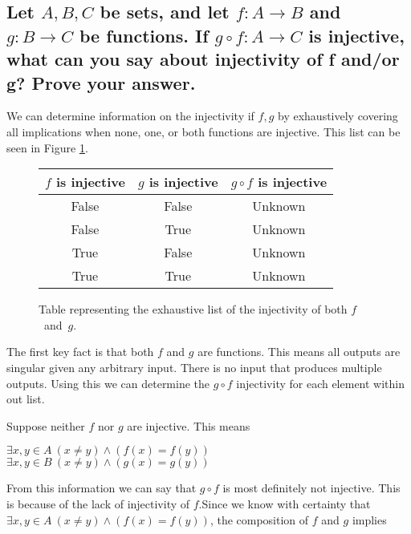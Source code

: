 \subsection{Let $A, B, C$ be sets, and let $f : A \rightarrow B$ and $g : B \rightarrow C$ be functions. If $g \circ f : A \rightarrow C$ is injective, what can you say about injectivity of f and/or g? Prove your answer.}

We can determine information on the injectivity if $f, g$ by exhaustively covering all implications when none, one, or both functions are injective. This list can be seen in Figure \ref{tab:injective}.

\begin{figure}[H]
  \begin{center}
    \begin{tabular}{|c|c|c|}
      \hline
      $f$ is injective & $g$ is injective & $g \circ f$ is injective \\
      \hline
      False & False & Unknown \\
      False & True & Unknown \\
      True & False & Unknown \\
      True & True & Unknown \\
      \hline
    \end{tabular}
  \end{center}
  \caption{Table representing the exhaustive list of the injectivity of both $f$~and~$g$.}
  \label{tab:injective}
\end{figure}

The first key fact is that both $f$ and $g$ are functions. This means all outputs are singular given any arbitrary input. There is no input that produces multiple outputs. Using this we can determine the $g \circ f$ injectivity for each element within out list.

Suppose neither $f$ nor $g$ are injective. This means
\begin{center}
  $\exists x,y \in A ~ (x \neq y) \land (f(x) = f(y))$ \\
  $\exists x,y \in B ~ (x \neq y) \land (g(x) = g(y))$ \\
\end{center}

From this information we can say that $g \circ f$ is most definitely not injective. This is because of the lack of injectivity of $f$.Since we know with certainty that $\exists x,y \in A ~ (x \neq y) \land (f(x) = f(y))$, the composition of $f$ and $g$ implies

